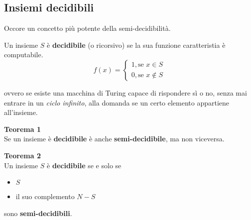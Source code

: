 \subsection{Insiemi decidibili}
Occore un concetto più potente della semi-decidibilità.
\begin{mdframed}[topline=false,bottomline=false,rightline=false]
    Un insieme $S$ è \textbf{decidibile} (o ricorsivo) se la sua funzione caratteristia è computabile.
    \begin{equation*}
        f(x) = 
        \begin{cases}
            1, \text{se } x \in S\\
            0, \text{se } x \notin S
        \end{cases}
    \end{equation*}
\end{mdframed}

ovvero se esiste una macchina di Turing capace di rispondere sì o no, senza mai entrare in un \textit{ciclo infinito}, alla domanda se un certo elemento appartiene all'insieme.

\begin{mdframed}[topline=false,bottomline=false,rightline=false]
    \textbf{Teorema 1}\\
    Se un insieme è \textbf{decidibile} è anche \textbf{semi-decidibile}, ma non viceversa.
\end{mdframed}

\begin{mdframed}[topline=false,bottomline=false,rightline=false]
    \textbf{Teorema 2}\\
    Un insieme $S$ è \textbf{decidibile} se e solo se
    \begin{itemize}
        \item $S$
        \item il suo complemento $N-S$
    \end{itemize}
    sono \textbf{semi-decidibili}.
\end{mdframed}

